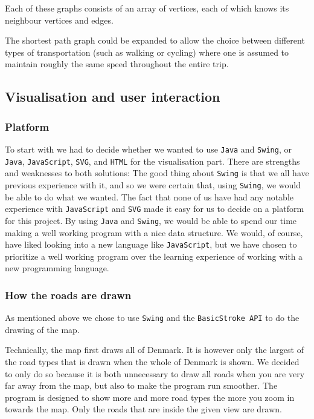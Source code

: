 \documentclass[a4paper,11pt]{article}
\begin{document}
Each of these graphs consists of an array of vertices, each of which knows its neighbour vertices and edges.		

The shortest path graph could be expanded to allow the choice between different types of transportation (such as walking or cycling) where one is assumed to maintain roughly the same speed throughout the entire trip.

\subsection{Visualisation and user interaction}

\subsubsection{Platform}
To start with we had to decide whether we wanted to use \texttt{Java} and \texttt{Swing}, or \texttt{Java}, \texttt{JavaScript}, \texttt{SVG}, and \texttt{HTML} for the visualisation part. There are strengths and weaknesses to both solutions: The good thing about \texttt{Swing} is that we all have previous experience with it, and so we were certain that, using \texttt{Swing}, we would be able to do what we wanted. 
The fact that none of us have had any notable experience with \texttt{JavaScript} and \texttt{SVG} made it easy for us to decide on a platform for this project. By using \texttt{Java} and \texttt{Swing}, we would be able to spend our time making a well working program with a nice data structure. We would, of course, have liked looking into a new language like \texttt{JavaScript}, but we have chosen to prioritize a well working program over the learning experience of working with a new programming language.

\subsubsection{How the roads are drawn}
As mentioned above we chose to use \texttt{Swing} and the \texttt{BasicStroke API} to do the drawing of the map. 

Technically, the map first draws all of Denmark. It is however only the largest of the road types that is drawn when the whole of Denmark is shown. We decided to only do so because it is both unnecessary to draw all roads when you are very far away from the map, but also to make the program run smoother. The program is designed to show more and more road types the more you zoom in towards the map. Only the roads that are inside the given view are drawn.
\end{document}
